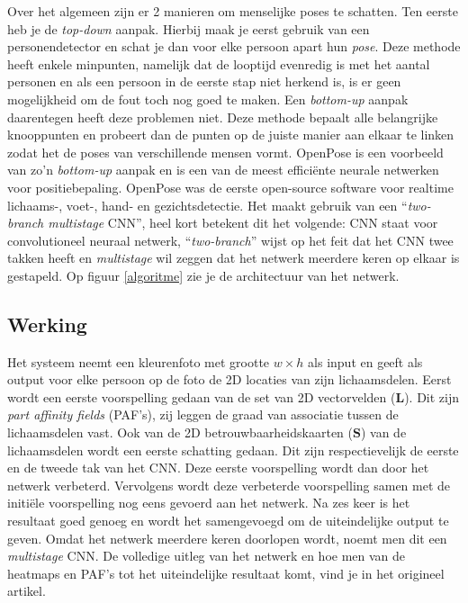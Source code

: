 \documentclass[a4paper,twoside,kulak]{kulakreport}
\begin{document}
Over het algemeen zijn er 2 manieren om menselijke poses te schatten. Ten eerste heb je de \textit{top-down} aanpak. Hierbij maak je eerst gebruik van een personendetector en schat je dan voor elke persoon apart hun \emph{pose}.  Deze methode heeft enkele minpunten, namelijk dat de looptijd evenredig is met het aantal personen en als een persoon in de eerste stap niet herkend is, is er geen mogelijkheid om de fout toch nog goed te maken. Een \textit{bottom-up} aanpak daarentegen heeft deze problemen niet. Deze methode bepaalt alle belangrijke knooppunten en probeert dan de punten op de juiste manier aan elkaar te linken zodat het de poses van verschillende mensen vormt. OpenPose is een voorbeeld van zo’n \textit{bottom-up} aanpak en is een van de meest efficiënte neurale netwerken voor positiebepaling. OpenPose was de eerste open-source software voor realtime lichaams-, voet-, hand- en gezichtsdetectie. Het maakt gebruik van een “\textit{two-branch multistage} CNN”, heel kort betekent dit het volgende: CNN staat voor convolutioneel neuraal netwerk, “\textit{two-branch}” wijst op het feit dat het CNN twee takken heeft en \textit{multistage} wil zeggen dat het netwerk meerdere keren op elkaar is gestapeld. Op figuur \ref{algoritme} zie je de architectuur van het netwerk.

\subsection{Werking}

Het systeem neemt een kleurenfoto met grootte $w \times h$ als input en geeft als output voor elke persoon op de foto de 2D locaties van zijn lichaamsdelen. Eerst wordt een eerste voorspelling gedaan van de set van 2D vectorvelden ($\textbf{L}$). Dit zijn \textit{part affinity fields} (PAF's), zij leggen de graad van associatie tussen de lichaamsdelen vast. Ook van de 2D betrouwbaarheidskaarten ($\textbf{S}$) van de lichaamsdelen wordt een eerste schatting gedaan. Dit zijn respectievelijk de eerste en de tweede tak van het CNN. Deze eerste voorspelling wordt dan door het netwerk verbeterd. Vervolgens wordt deze verbeterde voorspelling samen met de initiële voorspelling nog eens gevoerd aan het netwerk. Na zes keer is het resultaat goed genoeg en wordt het samengevoegd om de uiteindelijke output te geven. Omdat het netwerk meerdere keren doorlopen wordt, noemt men dit een \textit{multistage} CNN. De volledige uitleg van het netwerk en hoe men van de heatmaps en PAF's tot het uiteindelijke resultaat komt, vind je in het origineel artikel.\cite{cao2019openpose}
\end{document}
